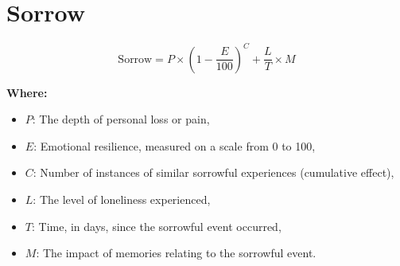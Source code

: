 \chapter{Sorrow}

\begin{equation}
\text{Sorrow} = P \times \left(1-\frac{E}{100}\right)^{C} + \frac{L}{T} \times M
\end{equation}

\textbf{Where:}

\begin{itemize}
    \item $P$: The depth of personal loss or pain,
    \item $E$: Emotional resilience, measured on a scale from 0 to 100,
    \item $C$: Number of instances of similar sorrowful experiences (cumulative effect),
    \item $L$: The level of loneliness experienced,
    \item $T$: Time, in days, since the sorrowful event occurred,
    \item $M$: The impact of memories relating to the sorrowful event.
\end{itemize}